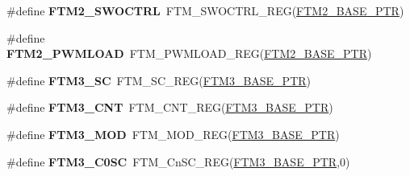 \begin{DoxyCompactItemize}
\item 
\hypertarget{group___f_t_m___register___accessor___macros_ga9eb1d689936a6322f55a184c3663456d}{}\#define {\bfseries F\+T\+M2\+\_\+\+S\+W\+O\+C\+T\+R\+L}~F\+T\+M\+\_\+\+S\+W\+O\+C\+T\+R\+L\+\_\+\+R\+E\+G(\hyperlink{group___f_t_m___peripheral_ga897564efeaf1be1f991305d294eda3d6}{F\+T\+M2\+\_\+\+B\+A\+S\+E\+\_\+\+P\+T\+R})\label{group___f_t_m___register___accessor___macros_ga9eb1d689936a6322f55a184c3663456d}

\item 
\hypertarget{group___f_t_m___register___accessor___macros_ga996d97c1bb37040242a8a8ca6792fa02}{}\#define {\bfseries F\+T\+M2\+\_\+\+P\+W\+M\+L\+O\+A\+D}~F\+T\+M\+\_\+\+P\+W\+M\+L\+O\+A\+D\+\_\+\+R\+E\+G(\hyperlink{group___f_t_m___peripheral_ga897564efeaf1be1f991305d294eda3d6}{F\+T\+M2\+\_\+\+B\+A\+S\+E\+\_\+\+P\+T\+R})\label{group___f_t_m___register___accessor___macros_ga996d97c1bb37040242a8a8ca6792fa02}

\item 
\hypertarget{group___f_t_m___register___accessor___macros_gaf6f94be4aa41c11ef7f8b894c1ce30a0}{}\#define {\bfseries F\+T\+M3\+\_\+\+S\+C}~F\+T\+M\+\_\+\+S\+C\+\_\+\+R\+E\+G(\hyperlink{group___f_t_m___peripheral_ga32dd0c357080d5680c0c5b3cf821adab}{F\+T\+M3\+\_\+\+B\+A\+S\+E\+\_\+\+P\+T\+R})\label{group___f_t_m___register___accessor___macros_gaf6f94be4aa41c11ef7f8b894c1ce30a0}

\item 
\hypertarget{group___f_t_m___register___accessor___macros_ga486689426fdcb2eb82d60b20601fefd1}{}\#define {\bfseries F\+T\+M3\+\_\+\+C\+N\+T}~F\+T\+M\+\_\+\+C\+N\+T\+\_\+\+R\+E\+G(\hyperlink{group___f_t_m___peripheral_ga32dd0c357080d5680c0c5b3cf821adab}{F\+T\+M3\+\_\+\+B\+A\+S\+E\+\_\+\+P\+T\+R})\label{group___f_t_m___register___accessor___macros_ga486689426fdcb2eb82d60b20601fefd1}

\item 
\hypertarget{group___f_t_m___register___accessor___macros_ga1f249c867dce6be235d323d6955908ac}{}\#define {\bfseries F\+T\+M3\+\_\+\+M\+O\+D}~F\+T\+M\+\_\+\+M\+O\+D\+\_\+\+R\+E\+G(\hyperlink{group___f_t_m___peripheral_ga32dd0c357080d5680c0c5b3cf821adab}{F\+T\+M3\+\_\+\+B\+A\+S\+E\+\_\+\+P\+T\+R})\label{group___f_t_m___register___accessor___macros_ga1f249c867dce6be235d323d6955908ac}

\item 
\hypertarget{group___f_t_m___register___accessor___macros_gad71eecb1cdf6c5c2e444ad6f9fb07899}{}\#define {\bfseries F\+T\+M3\+\_\+\+C0\+S\+C}~F\+T\+M\+\_\+\+Cn\+S\+C\+\_\+\+R\+E\+G(\hyperlink{group___f_t_m___peripheral_ga32dd0c357080d5680c0c5b3cf821adab}{F\+T\+M3\+\_\+\+B\+A\+S\+E\+\_\+\+P\+T\+R},0)\label{group___f_t_m___register___accessor___macros_gad71eecb1cdf6c5c2e444ad6f9fb07899}


\end{DoxyCompactItemize}
